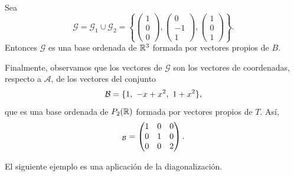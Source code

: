 \documentclass[12pt,a4paper]{book}
\begin{document}
\begin{ejemplo}
        Sea
        \begin{equation*}
            \mathcal{G}=\mathcal{G}_1\cup\mathcal{G}_2=\left\{\begin{pmatrix}1\\0\\0\end{pmatrix}, \begin{pmatrix}0\\-1\\1\end{pmatrix}, \begin{pmatrix}1\\0\\1\end{pmatrix}\right\}.
        \end{equation*}
        Entonces $\mathcal{G}$ es una base ordenada de $\mathbb{R}^3$ formada por vectores propios de $B$.

        Finalmente, observamos que los vectores de $\mathcal{G}$ son los vectores de coordenadas, respecto a $\mathcal{A}$, de los vectores del conjunto
        \begin{equation*}
            \BB=\{1,\ -x+x^2,\ 1+x^2\},
        \end{equation*}
        que es una base ordenada de $P_2(\mathbb{R})$ formada por vectores propios de $T$. Así,
        \begin{equation*}
            [T]_{\BB}=\begin{pmatrix}1&0&0\\0&1&0\\0&0&2\end{pmatrix}.
        \end{equation*}
    \end{ejemplo}

    El siguiente ejemplo es una aplicación de la diagonalización.
\end{document}
